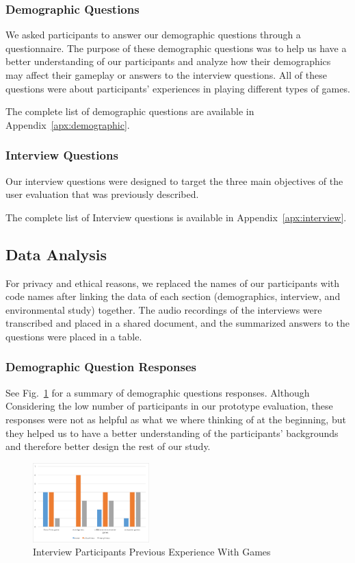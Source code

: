 \documentclass{sigchi}
\begin{document}
\subsubsection{Demographic Questions}
We asked participants to answer our demographic questions through a questionnaire. The purpose of these demographic questions was to help us have a better understanding of our participants and analyze how their demographics may affect their gameplay or answers to the interview questions. All of these questions were about participants' experiences in playing different types of games.

The complete list of demographic questions are available in Appendix~\ref{apx:demographic}.


\subsubsection{Interview Questions}
Our interview questions were designed to target the three main objectives of the user evaluation that was previously described. 

The complete list of Interview questions is available in Appendix~\ref{apx:interview}.

\subsection{Data Analysis}
For privacy and ethical reasons, we replaced the names of our participants with code names after linking the data of each section (demographics, interview, and environmental study) together.
The audio recordings of the interviews were transcribed and placed in a shared document, and the summarized answers to the questions were placed in a table.

\subsubsection{Demographic Question Responses}
See Fig.\@~\ref{fig:demographics} for a summary of demographic questions responses. Although Considering the low number of participants in our prototype evaluation, these responses were not as helpful as what we where thinking of at the beginning, but they helped us to have a better understanding of the participants' backgrounds and therefore better design the rest of our study.

\begin{figure}
\centering
\includegraphics[width=0.4\textwidth]{demographics.png}
\caption{Interview Participants Previous Experience With Games}
\label{fig:demographics}
\end{figure}
\end{document}
